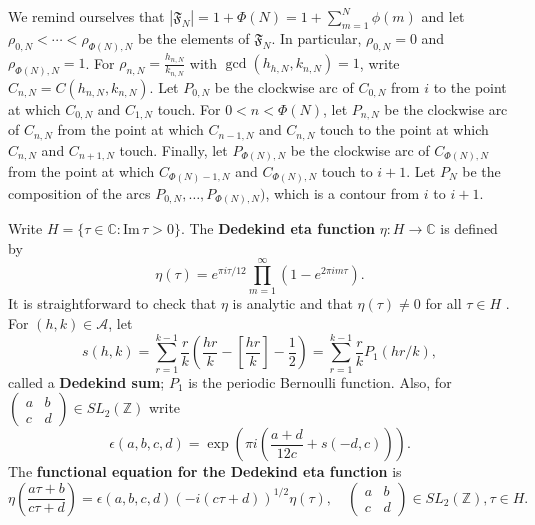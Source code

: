 \documentclass{amsart}
\def\Im{\ensuremath{\mathrm{Im}}\,}
\begin{document}
We remind ourselves that $|\mathfrak{F}_N|=1+\Phi(N) = 1+\sum_{m=1}^N \phi(m)$ and let
 $\rho_{0,N} <  \cdots < \rho_{\Phi(N),N}$ be the elements of $\mathfrak{F}_N$. In particular,
$\rho_{0,N}=0$ and $\rho_{\Phi(N),N}=1$.  For $\rho_{n,N} = \frac{h_{n,N}}{k_{n,N}}$ with
$\gcd(h_{h,N},k_{n,N})=1$,
write
$C_{n,N} = C(h_{n,N},k_{n,N})$. 
Let $P_{0,N}$ be the clockwise arc of $C_{0,N}$ from $i$ to the point at which $C_{0,N}$ and $C_{1,N}$ touch. 
For $0<n<\Phi(N)$, let $P_{n,N}$ be the clockwise arc of $C_{n,N}$ from the point at which $C_{n-1,N}$ and $C_{n,N}$ touch
to the point at which $C_{n,N}$ and $C_{n+1,N}$ touch. Finally, let $P_{\Phi(N),N}$ be the clockwise arc of $C_{\Phi(N),N}$ from the point at which
$C_{\Phi(N)-1,N}$ and $C_{\Phi(N),N}$ touch to $i+1$. Let $P_N$ be the composition of the arcs $P_{0,N},\ldots,
P_{\Phi(N),N})$, which is a contour from $i$ to $i+1$. 

Write $H = \{\tau \in \mathbb{C} : \Im \tau > 0\}$. 
The \textbf{Dedekind eta function} $\eta:H \to \mathbb{C}$ is defined by
\[
\eta(\tau) = e^{\pi i \tau/12} \prod_{m=1}^\infty (1-e^{2\pi im\tau}).
\]
It is straightforward to check that $\eta$ is analytic and that
$\eta(\tau) \neq 0$ for all $\tau \in H$ \cite[pp.~17--18, \S 1.44]{titchmarsh}. For 
$(h,k) \in \mathscr{A}$, let
\[
s(h,k) = \sum_{r=1}^{k-1} \frac{r}{k} \left( \frac{hr}{k} - \left[ \frac{hr}{k} \right] - \frac{1}{2}\right)
=\sum_{r=1}^{k-1} \frac{r}{k} P_1(hr/k),
\]
called a \textbf{Dedekind sum}; $P_1$ is the periodic Bernoulli function.
Also, for $\begin{pmatrix}a&b\\c&d\end{pmatrix} \in SL_2(\mathbb{Z})$ write
\[
\epsilon(a,b,c,d)  = \exp\left( \pi i\left(\frac{a+d}{12c} + s(-d,c)\right) \right).
\]
The \textbf{functional equation for the Dedekind eta function} \cite[p.~52, Theorem 3.4]{apostol} is 
\[
\eta\left( \frac{a\tau +b}{c\tau+d} \right) = \epsilon(a,b,c,d) (-i(c\tau+d))^{1/2} \eta(\tau),
\quad \begin{pmatrix}a&b\\c&d\end{pmatrix} \in SL_2(\mathbb{Z}), \tau \in H.
\]
\end{document}
